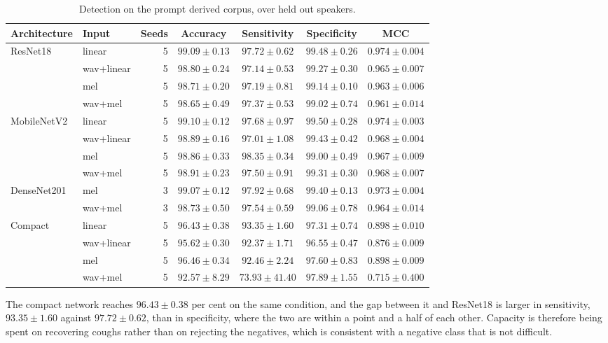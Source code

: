 \documentclass{ieeeaccess}
\begin{document}
\begin{table}[tbp]
\caption{Detection on the prompt derived corpus, over held out speakers.}\label{tab:grid}
\small
\begin{tabular}{@{}llrcccc@{}}
\toprule
Architecture & Input & Seeds & Accuracy & Sensitivity & Specificity & MCC \\
\midrule
ResNet18 & linear & 5 & $99.09 \pm 0.13$ & $97.72 \pm 0.62$ & $99.48 \pm 0.26$ & $0.974 \pm 0.004$ \\
 & wav+linear & 5 & $98.80 \pm 0.24$ & $97.14 \pm 0.53$ & $99.27 \pm 0.30$ & $0.965 \pm 0.007$ \\
 & mel & 5 & $98.71 \pm 0.20$ & $97.19 \pm 0.81$ & $99.14 \pm 0.10$ & $0.963 \pm 0.006$ \\
 & wav+mel & 5 & $98.65 \pm 0.49$ & $97.37 \pm 0.53$ & $99.02 \pm 0.74$ & $0.961 \pm 0.014$ \\
\addlinespace
MobileNetV2 & linear & 5 & $99.10 \pm 0.12$ & $97.68 \pm 0.97$ & $99.50 \pm 0.28$ & $0.974 \pm 0.003$ \\
 & wav+linear & 5 & $98.89 \pm 0.16$ & $97.01 \pm 1.08$ & $99.43 \pm 0.42$ & $0.968 \pm 0.004$ \\
 & mel & 5 & $98.86 \pm 0.33$ & $98.35 \pm 0.34$ & $99.00 \pm 0.49$ & $0.967 \pm 0.009$ \\
 & wav+mel & 5 & $98.91 \pm 0.23$ & $97.50 \pm 0.91$ & $99.31 \pm 0.30$ & $0.968 \pm 0.007$ \\
\addlinespace
DenseNet201 & mel & 3 & $99.07 \pm 0.12$ & $97.92 \pm 0.68$ & $99.40 \pm 0.13$ & $0.973 \pm 0.004$ \\
 & wav+mel & 3 & $98.73 \pm 0.50$ & $97.54 \pm 0.59$ & $99.06 \pm 0.78$ & $0.964 \pm 0.014$ \\
\addlinespace
Compact & linear & 5 & $96.43 \pm 0.38$ & $93.35 \pm 1.60$ & $97.31 \pm 0.74$ & $0.898 \pm 0.010$ \\
 & wav+linear & 5 & $95.62 \pm 0.30$ & $92.37 \pm 1.71$ & $96.55 \pm 0.47$ & $0.876 \pm 0.009$ \\
 & mel & 5 & $96.46 \pm 0.34$ & $92.46 \pm 2.24$ & $97.60 \pm 0.83$ & $0.898 \pm 0.009$ \\
 & wav+mel & 5 & $92.57 \pm 8.29$ & $73.93 \pm 41.40$ & $97.89 \pm 1.55$ & $0.715 \pm 0.400$ \\
\bottomrule
\end{tabular}
\end{table}

The compact network reaches $96.43 \pm 0.38$ per cent on the same condition, and the gap
between it and ResNet18 is larger in sensitivity, $93.35 \pm 1.60$ against
$97.72 \pm 0.62$, than in specificity, where the two are within a point and a half of each
other. Capacity is therefore being spent on recovering coughs rather than on rejecting the
negatives, which is consistent with a negative class that is not difficult.
\end{document}
